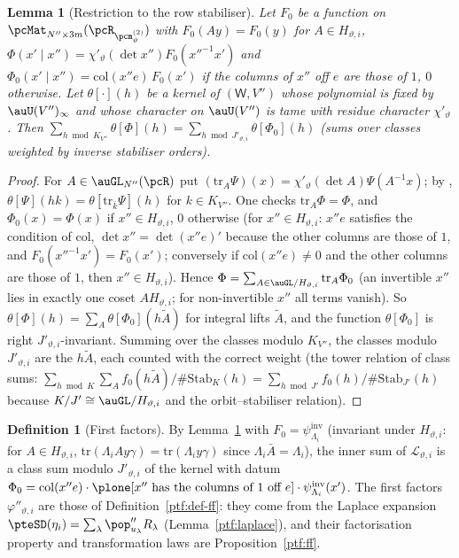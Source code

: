 \documentclass[10pt]{amsart}
\newtheorem{lemma}[theorem]{Lemma}
\theoremstyle{definition}
\newtheorem{definition}[theorem]{Definition}
\theoremstyle{remark}
\begin{document}
\begin{lemma}[Restriction to the row stabiliser]\label{pte:rowstab}
Let $F_0$ be a function on $\pcMat_{N''\times3m}(\pcR_{\pcm^{(2)}_\vartheta})$ with $F_0(Ay)=F_0(y)$ for $A\in H_{\vartheta,i}$,
$\Phi(x'\mid x'')=\chi'_\vartheta(\det x'')F_0(x''^{-1}x')$ and $\Phi_0(x'\mid x'')=\mathrm{col}(x''e)\,F_0(x')$ if the
columns of $x''$ off $e$ are those of $1$, $0$ otherwise. Let $\theta[\cdot](h)$ be a kernel of $(\mathsf W,V'')$
whose polynomial is fixed by $\auU(V'')_\infty$ and whose character on $\auU(V'')$ is tame with residue character
$\chi'_\vartheta$. Then $\sum_{h\bmod K_{V''}}\theta[\Phi](h)=\sum_{h\bmod J'_{\vartheta,i}}\theta[\Phi_0](h)$ (sums over
classes weighted by inverse stabiliser orders).
\end{lemma}
\begin{proof}
For $A\in\auGL_{N''}(\pcR)$ put $(\mathrm{tr}_A\Psi)(x)=\chi'_\vartheta(\det A)\Psi(A^{-1}x)$; by {\cite[Lemma~2.9]{P53}},
$\theta[\Psi](hk)=\theta[\mathrm{tr}_{\bar k}\Psi](h)$ for $k\in K_{V''}$. One checks $\mathrm{tr}_A\Phi=\Phi$, and
$\Phi_0(x)=\Phi(x)$ if $x''\in H_{\vartheta,i}$, $0$ otherwise (for $x''\in H_{\vartheta,i}$: $x''e$ satisfies the condition of
$\mathrm{col}$, $\det x''=\det(x''e)'$ because the other columns are those of $1$, and $F_0(x''^{-1}x')=F_0(x')$; conversely
if $\mathrm{col}(x''e)\ne0$ and the other columns are those of $1$, then $x''\in H_{\vartheta,i}$). Hence $\Phi=\sum_{A\in
\auGL/H_{\vartheta,i}}\mathrm{tr}_A\Phi_0$ (an invertible $x''$ lies in exactly one coset $AH_{\vartheta,i}$; for non-invertible $x''$
all terms vanish). So $\theta[\Phi](h)=\sum_A\theta[\Phi_0](h\tilde A)$ for integral lifts $\tilde A$, and the function
$\theta[\Phi_0]$ is right $J'_{\vartheta,i}$-invariant. Summing over the classes modulo $K_{V''}$, the classes modulo
$J'_{\vartheta,i}$ are the $h\tilde A$, each counted with the correct weight (the tower relation of class sums:
$\sum_{h\bmod K}\sum_A f_0(h\tilde A)/\#\mathrm{Stab}_K(h)=\sum_{h\bmod J'}f_0(h)/\#\mathrm{Stab}_{J'}(h)$ because $K/J'\cong
\auGL/H_{\vartheta,i}$ and the orbit--stabiliser relation).
\end{proof}

\begin{definition}[First factors]\label{pte:def-ff}
By Lemma~\ref{pte:rowstab} with $F_0=\psi^{\mathrm{inv}}_{\Lambda_i}$ (invariant under $H_{\vartheta,i}$: for $A\in H_{\vartheta,i}$,
$\mathrm{tr}(\Lambda_iAy\gamma)=\mathrm{tr}(\Lambda_iy\gamma)$ since $\Lambda_i\bar A=\Lambda_i$), the inner sum of
$\mathcal L_{\vartheta,i}$ is a class sum modulo $J'_{\vartheta,i}$ of the kernel with datum $\Phi_0=\mathrm{col}(x''e)\cdot
\plone[x''\text{ has the columns of }1\text{ off }e]\cdot\psi^{\mathrm{inv}}_{\Lambda_i}(x')$. The first factors
$\varphi''_{\vartheta,i}$ are those of Definition~\ref{ptf:def-ff}: they come from the Laplace expansion
$\pteSD(\eta_i)=\sum_\lambda\pop''_{u_\lambda}R_\lambda$ (Lemma~\ref{ptf:laplace}), and their factorisation property and
transformation laws are Proposition~\ref{ptf:ff}.
\end{definition}
\end{document}
